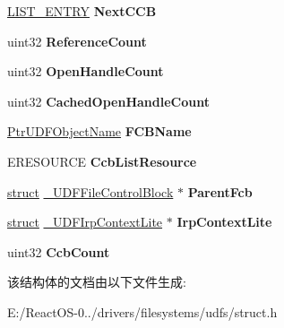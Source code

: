 \begin{DoxyCompactItemize}
\hyperlink{struct___l_i_s_t___e_n_t_r_y}{L\+I\+S\+T\+\_\+\+E\+N\+T\+RY} {\bfseries Next\+C\+CB}
\item 
\mbox{\label{struct___u_d_f_file_control_block_ac8c0bd75583de370e43862a872ccbc5a}} 
uint32 {\bfseries Reference\+Count}
\item 
\mbox{\label{struct___u_d_f_file_control_block_a91f3d2a3fb65dd0887c640130f81cd1b}} 
uint32 {\bfseries Open\+Handle\+Count}
\item 
\mbox{\label{struct___u_d_f_file_control_block_aae6604bd3a0ed10e2f45a68ca844b9b8}} 
uint32 {\bfseries Cached\+Open\+Handle\+Count}
\item 
\mbox{\label{struct___u_d_f_file_control_block_a2ad0858cae791408c614e951ca8c4c15}} 
\hyperlink{struct___u_d_f_object_name}{Ptr\+U\+D\+F\+Object\+Name} {\bfseries F\+C\+B\+Name}
\item 
\mbox{\label{struct___u_d_f_file_control_block_a23357991c7c3f06f979c2b3862338157}} 
E\+R\+E\+S\+O\+U\+R\+CE {\bfseries Ccb\+List\+Resource}
\item 
\mbox{\label{struct___u_d_f_file_control_block_a754a44d5e8ec0d86567525c0e8dc1dcb}} 
\hyperlink{interfacestruct}{struct} \hyperlink{struct___u_d_f_file_control_block}{\+\_\+\+U\+D\+F\+File\+Control\+Block} $\ast$ {\bfseries Parent\+Fcb}
\item 
\mbox{\label{struct___u_d_f_file_control_block_a39e51354264518d25449ffe8a22a45de}} 
\hyperlink{interfacestruct}{struct} \hyperlink{struct___u_d_f_irp_context_lite}{\+\_\+\+U\+D\+F\+Irp\+Context\+Lite} $\ast$ {\bfseries Irp\+Context\+Lite}
\item 
\mbox{\label{struct___u_d_f_file_control_block_a233718c992d4a48ce4c3888cf7768521}} 
uint32 {\bfseries Ccb\+Count}
\end{DoxyCompactItemize}


该结构体的文档由以下文件生成\+:\begin{DoxyCompactItemize}
\item 
E\+:/\+React\+O\+S-\/0../drivers/filesystems/udfs/struct.\+h\end{DoxyCompactItemize}
